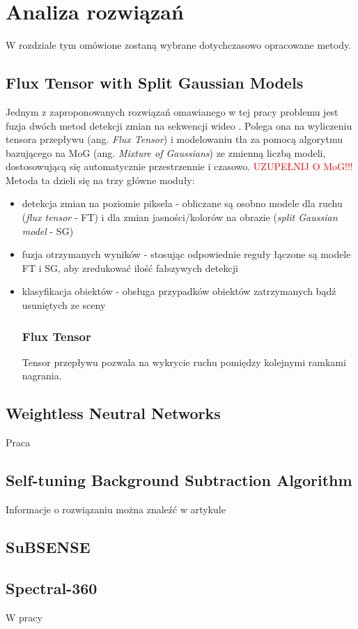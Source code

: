 \chapter{Analiza rozwiązań}
\label{cha:analiza}

W rozdziale tym omówione zostaną wybrane dotychczasowo opracowane metody.


\section{Flux Tensor with Split Gaussian Models}
\label{sec:FTSG}

Jednym z zaproponowanych rozwiązań omawianego w tej pracy problemu jest fuzja dwóch metod detekcji zmian na sekwencji wideo \cite{6910016}. Polega ona na wyliczeniu tensora przepływu (ang. \textit{Flux Tensor}) i modelowaniu tła za pomocą algorytmu bazującego na MoG (ang. \textit{Mixture of Gaussians}) ze zmienną liczbą modeli, dostosowującą się automatycznie przestrzennie i czasowo. \textcolor{red}{UZUPEŁNIJ O MoG!!!}
Metoda ta dzieli się na trzy główne moduły:
\begin{itemize}
\item
detekcja zmian na poziomie piksela - obliczane są osobno modele dla ruchu (\textit{flux tensor} - FT) i dla zmian jasności/kolorów na obrazie (\textit{split Gaussian model} - SG)
\item
fuzja otrzymanych wyników - stosując odpowiednie reguły łączone są modele FT i SG, aby zredukować ilość fałszywych detekcji
\item
klasyfikacja obiektów - obsługa przypadków obiektów zatrzymanych bądź usuniętych ze sceny
\subsection{Flux Tensor}
Tensor przepływu pozwala na wykrycie ruchu pomiędzy kolejnymi ramkami nagrania. 
\end{itemize}
\section{Weightless Neutral Networks}
Praca \cite{6910014}
\section{Self-tuning Background Subtraction Algorithm}
Informacje o rozwiązaniu można znaleźć w artykule \cite{6910012}
\section{SuBSENSE}
\cite{stflexible}
\section{Spectral-360}
W pracy \cite{6910013}


